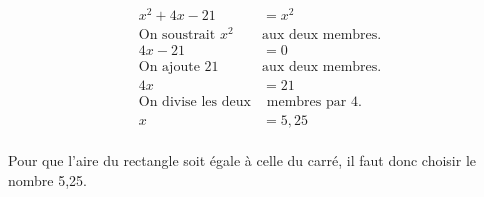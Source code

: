 \begin{enumerate}[itemsep=1em]
\begin{align*}
x^2+4x-21 & = x^2\\
\text{On soustrait $x^2$}&\text{aux deux membres.}\\
4x-21 & = 0\\
\text{On ajoute 21}&\text{aux deux membres.}\\
4x & = 21\\
\text{On divise les deux}&\text{ membres par 4.}\\
x &= 5,25\\
\end{align*}


\par\vspace{0.5cm}
Pour que l'aire du rectangle soit égale à celle du carré, il faut donc choisir le nombre 5,25.
\end{enumerate}

\medskip

\clearpage
